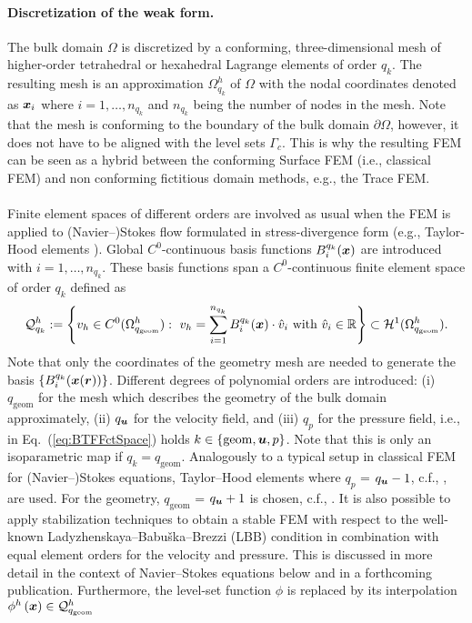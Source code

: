 \documentclass[12pt, twoside, english]{article}
\numberwithin{equation}{section}
\newcommand{\vek}[1]{\mathchoice{\displaystyle\boldsymbol#1}
{\textstyle\boldsymbol#1}{\scriptstyle\boldsymbol#1}
{\scriptscriptstyle\boldsymbol#1}}
\begin{document}
\paragraph{Discretization of the weak form.} The bulk domain $\Omega$ is discretized by a conforming, three-dimensional mesh of higher-order  tetrahedral or hexahedral Lagrange elements of order $q_k$. The resulting mesh is an approximation $\Omega_{q_k}^{h}$ of $\Omega$ with the nodal coordinates denoted as $\vek{x}_{i}$ where $i=1,\dots,n_{q_k}$ and $n_{q_k}$ being the number of nodes in the mesh. Note that the mesh is conforming to the boundary of the bulk domain $\partial \Omega$, however, it does not have to be aligned with the level sets $\Gamma_{\!c}$. This is why the resulting FEM can be seen as a hybrid between the conforming Surface FEM (i.e., classical FEM) and non conforming fictitious domain methods, e.g., the Trace FEM.\\
\\
Finite element spaces of different orders are involved as usual when the FEM is applied to (Navier--)Stokes flow formulated in stress-divergence form (e.g., Taylor-Hood elements \cite{Taylor_1973a}). Global $C^{0}$-continuous basis functions $B_{i}^{q_k}\!\left(\vek{x}\right)$ are introduced with $i = 1,\ldots,{n_{q_k}}$. These basis functions span a $C^{0}$-continuous finite element space of order $q_k$ defined as
\begin{align}
	\mathcal{Q}_{q_k}^{h}:=\left\lbrace v_{h}\in C^{0}(\Omega_{q_{\mathrm{geom}}}^{h}):\ v_{h}=\sum_{i=1}^{n_{q_k}}B_{i}^{q_k}(\vek{x})\cdot\hat{v}_{i}\text{ with }\hat{v}_{i}\in\mathbb{R}\right\rbrace \subset\mathcal{H}^{1}(\Omega_{q_{\mathrm{geom}}}^{h}).\label{eq:BTFFctSpace}
\end{align} 
Note that only the coordinates of the geometry mesh are needed to generate the basis $\{B_{i}^{q_k}\!\left(\vek{x}\!\left(\vek{r}\right)\right)\}$. Different degrees of polynomial orders are introduced: (i) $q_{\mathrm{geom}}$ for the mesh which describes the geometry of the bulk domain approximately, (ii) $q_{\vek{u}}$ for the velocity field, and (iii) $q_{p}$ for the pressure field, i.e., in Eq.~(\ref{eq:BTFFctSpace}) holds $k\in \left\{\mathrm{geom},\vek{u},p\right\}$. Note that this is only an isoparametric map if $q_k = q_{\mathrm{geom}}$. Analogously to a typical setup in classical FEM for (Navier--)Stokes equations, Taylor--Hood elements where $q_{p}$ = $q_{\vek{u}}-1$, c.f., \cite{Taylor_1973a}, are used. For the geometry, $q_{\mathrm{geom}}$ = $q_{\vek{u}}+1$ is chosen, c.f., \cite{Fries_2018a}. It is also possible to apply stabilization techniques to obtain a stable FEM with respect to the well-known Ladyzhenskaya--Babu\v ska--Brezzi (LBB) condition \cite{Babuska_1971a,Brezzi_1974,Ladyzhenskaya_1969a,Franca_1988a} in combination with equal element orders for the velocity and pressure. This is discussed in more detail in the context of Navier--Stokes equations below and in a forthcoming publication. Furthermore, the level-set function $\phi$ is replaced by its interpolation $\phi^{h}\left(\vek{x}\right)\in\mathcal{Q}_{q_{\mathrm{geom}}}^{h}$
\end{document}
